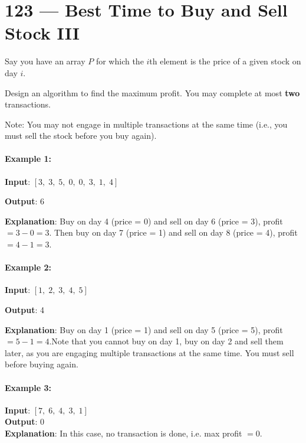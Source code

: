 \section{123 --- Best Time to Buy and Sell Stock III}
Say you have an array $P$ for which the $i$th element is the price of a given stock on day $i$.

Design an algorithm to find the maximum profit. You may complete at most \textbf{two} transactions.

Note: You may not engage in multiple transactions at the same time (i.e., you must sell the stock before you buy again).
\paragraph{Example 1:}
\begin{flushleft}
\textbf{Input}: $[3,\;3,\;5,\;0,\;0,\;3,\;1,\;4]$

\textbf{Output}: 6

\textbf{Explanation}: Buy on day 4 (price = 0) and sell on day 6 (price = 3), profit $= 3-0 = 3$. Then buy on day 7 (price = 1) and sell on day 8 (price = 4), profit $= 4-1 = 3$.
\end{flushleft}
\paragraph{Example 2:}
\begin{flushleft}
\textbf{Input}: $[1,\;2,\;3,\;4,\;5]$

\textbf{Output}: 4

\textbf{Explanation}: Buy on day 1 (price = 1) and sell on day 5 (price = 5), profit $= 5-1 = 4$.Note that you cannot buy on day 1, buy on day 2 and sell them later, as you are engaging multiple transactions at the same time. You must sell before buying again.
\end{flushleft}
\paragraph{Example 3:}
\begin{flushleft}
\textbf{Input}: $[7,\;6,\;4,\;3,\;1]$
\\
\textbf{Output}: 0
\\
\textbf{Explanation}: In this case, no transaction is done, i.e. max profit $= 0$.
\end{flushleft}

